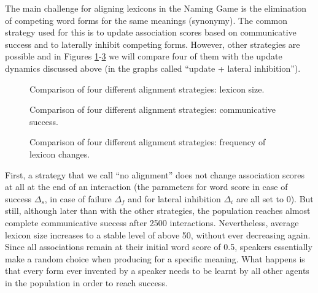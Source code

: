 The main challenge for aligning lexicons in the Naming Game is the
elimination of competing word forms for the same meanings
(synonymy). The common strategy used for this is to update association
scores based on communicative success and to laterally inhibit
competing forms. However, other strategies are possible and in Figures
\ref{f:ng-alignment-strategy-vs-lexicon-size}-\ref{f:ng-alignment-strategy-vs-lexicon-changes}
we will compare four of them with the update dynamics discussed above
(in the graphs called ``update + lateral inhibition'').

\startfiguregroup

\begin{figure}[t]
  \caption{Compar\-ison of four different alignment strategies: lexicon
    size.}
  \label{f:ng-alignment-strategy-vs-lexicon-size}
\end{figure}

\begin{figure}[t]
  \caption{Compar\-ison of four different alignment strategies:
    communicative success.}
  \label{f:ng-alignment-strategy-vs-communicative-success}
\end{figure}

\begin{figure}[t]
  \caption{Compar\-ison of four different alignment strategies:
    frequency of lexicon changes.}
  \label{f:ng-alignment-strategy-vs-lexicon-changes}
\end{figure}

\stopfiguregroup

First, a strategy that we call ``no alignment'' does not change
association scores at all at the end of an interaction (the parameters
for word score in case of success $\Delta_s$, in case of failure
$\Delta_f$ and for lateral inhibition $\Delta_i$ are all set to
0). But still, although later than with the other strategies, the
population reaches almost complete communicative success after 2500
interactions. Nevertheless, average lexicon size increases to a stable
level of above 50, without ever decreasing again. Since all
associations remain at their initial word score of 0.5, speakers
essentially make a random choice when producing for a specific
meaning. What happens is that every form ever invented by a speaker
needs to be learnt by all other agents in the population in order to
reach success.

